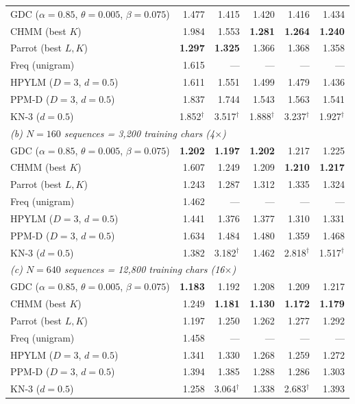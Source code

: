 \begin{table}[t]
\begin{tabular}{l r r r r r}
GDC ($\alpha{=}0.85$, $\theta{=}0.005$, $\beta{=}0.075$) & 1.477 & 1.415 & 1.420 & 1.416 & 1.434 \\
CHMM (best $K$) & 1.984 & 1.553 & \textbf{1.281} & \textbf{1.264} & \textbf{1.240} \\
Parrot (best $L,K$) & \textbf{1.297} & \textbf{1.325} & 1.366 & 1.368 & 1.358 \\
Freq (unigram) & 1.615 & --- & --- & --- & --- \\
HPYLM ($D{=}3$, $d{=}0.5$) & 1.611 & 1.551 & 1.499 & 1.479 & 1.436 \\
PPM-D ($D{=}3$, $d{=}0.5$) & 1.837 & 1.744 & 1.543 & 1.563 & 1.541 \\
KN-3 ($d{=}0.5$) & 1.852$^\dagger$ & 3.517$^\dagger$ & 1.888$^\dagger$ & 3.237$^\dagger$ & 1.927$^\dagger$ \\
\midrule
\multicolumn{6}{l}{\emph{(b) $N{=}160$ sequences = 3{,}200 training chars (4$\times$)}} \\
GDC ($\alpha{=}0.85$, $\theta{=}0.005$, $\beta{=}0.075$) & \textbf{1.202} & \textbf{1.197} & \textbf{1.202} & 1.217 & 1.225 \\
CHMM (best $K$) & 1.607 & 1.249 & 1.209 & \textbf{1.210} & \textbf{1.217} \\
Parrot (best $L,K$) & 1.243 & 1.287 & 1.312 & 1.335 & 1.324 \\
Freq (unigram) & 1.462 & --- & --- & --- & --- \\
HPYLM ($D{=}3$, $d{=}0.5$) & 1.441 & 1.376 & 1.377 & 1.310 & 1.331 \\
PPM-D ($D{=}3$, $d{=}0.5$) & 1.634 & 1.484 & 1.480 & 1.359 & 1.468 \\
KN-3 ($d{=}0.5$) & 1.382 & 3.182$^\dagger$ & 1.462 & 2.818$^\dagger$ & 1.517$^\dagger$ \\
\midrule
\multicolumn{6}{l}{\emph{(c) $N{=}640$ sequences = 12{,}800 training chars (16$\times$)}} \\
GDC ($\alpha{=}0.85$, $\theta{=}0.005$, $\beta{=}0.075$) & \textbf{1.183} & 1.192 & 1.208 & 1.209 & 1.217 \\
CHMM (best $K$) & 1.249 & \textbf{1.181} & \textbf{1.130} & \textbf{1.172} & \textbf{1.179} \\
Parrot (best $L,K$) & 1.197 & 1.250 & 1.262 & 1.277 & 1.292 \\
Freq (unigram) & 1.458 & --- & --- & --- & --- \\
HPYLM ($D{=}3$, $d{=}0.5$) & 1.341 & 1.330 & 1.268 & 1.259 & 1.272 \\
PPM-D ($D{=}3$, $d{=}0.5$) & 1.394 & 1.385 & 1.288 & 1.286 & 1.303 \\
KN-3 ($d{=}0.5$) & 1.258 & 3.064$^\dagger$ & 1.338 & 2.683$^\dagger$ & 1.393 \\
\bottomrule
\end{tabular}
\end{table}


